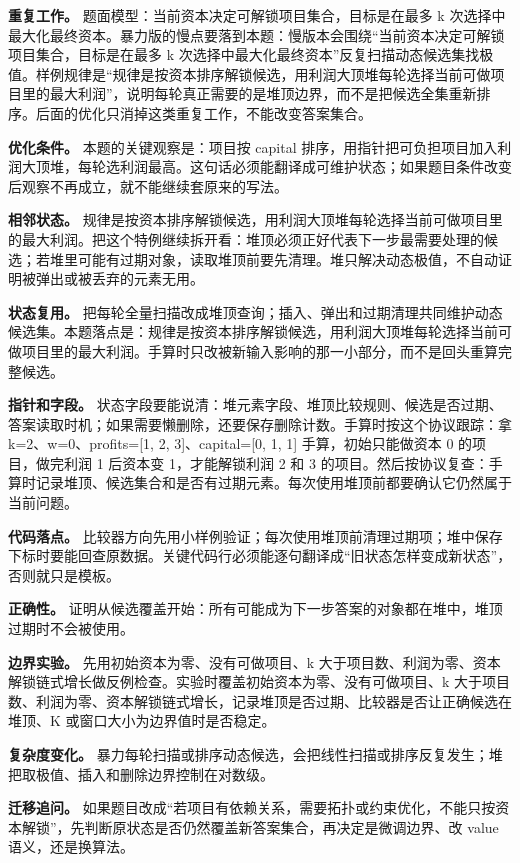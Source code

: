 \textbf{重复工作。} 题面模型：当前资本决定可解锁项目集合，目标是在最多 k 次选择中最大化最终资本。暴力版的慢点要落到本题：慢版本会围绕“当前资本决定可解锁项目集合，目标是在最多 k 次选择中最大化最终资本”反复扫描动态候选集找极值。样例规律是“规律是按资本排序解锁候选，用利润大顶堆每轮选择当前可做项目里的最大利润”，说明每轮真正需要的是堆顶边界，而不是把候选全集重新排序。后面的优化只消掉这类重复工作，不能改变答案集合。

\textbf{优化条件。} 本题的关键观察是：项目按 capital 排序，用指针把可负担项目加入利润大顶堆，每轮选利润最高。这句话必须能翻译成可维护状态；如果题目条件改变后观察不再成立，就不能继续套原来的写法。

\textbf{相邻状态。} 规律是按资本排序解锁候选，用利润大顶堆每轮选择当前可做项目里的最大利润。把这个特例继续拆开看：堆顶必须正好代表下一步最需要处理的候选；若堆里可能有过期对象，读取堆顶前要先清理。堆只解决动态极值，不自动证明被弹出或被丢弃的元素无用。

\textbf{状态复用。} 把每轮全量扫描改成堆顶查询；插入、弹出和过期清理共同维护动态候选集。本题落点是：规律是按资本排序解锁候选，用利润大顶堆每轮选择当前可做项目里的最大利润。手算时只改被新输入影响的那一小部分，而不是回头重算完整候选。

\textbf{指针和字段。} 状态字段要能说清：堆元素字段、堆顶比较规则、候选是否过期、答案读取时机；如果需要懒删除，还要保存删除计数。手算时按这个协议跟踪：拿 k=2、w=0、profits=[1, 2, 3]、capital=[0, 1, 1] 手算，初始只能做资本 0 的项目，做完利润 1 后资本变 1，才能解锁利润 2 和 3 的项目。然后按协议复查：手算时记录堆顶、候选集合和是否有过期元素。每次使用堆顶前都要确认它仍然属于当前问题。

\textbf{代码落点。} 比较器方向先用小样例验证；每次使用堆顶前清理过期项；堆中保存下标时要能回查原数据。关键代码行必须能逐句翻译成“旧状态怎样变成新状态”，否则就只是模板。

\textbf{正确性。} 证明从候选覆盖开始：所有可能成为下一步答案的对象都在堆中，堆顶过期时不会被使用。

\textbf{边界实验。} 先用初始资本为零、没有可做项目、k 大于项目数、利润为零、资本解锁链式增长做反例检查。实验时覆盖初始资本为零、没有可做项目、k 大于项目数、利润为零、资本解锁链式增长，记录堆顶是否过期、比较器是否让正确候选在堆顶、K 或窗口大小为边界值时是否稳定。

\textbf{复杂度变化。} 暴力每轮扫描或排序动态候选，会把线性扫描或排序反复发生；堆把取极值、插入和删除边界控制在对数级。

\textbf{迁移追问。} 如果题目改成“若项目有依赖关系，需要拓扑或约束优化，不能只按资本解锁”，先判断原状态是否仍然覆盖新答案集合，再决定是微调边界、改 value 语义，还是换算法。

